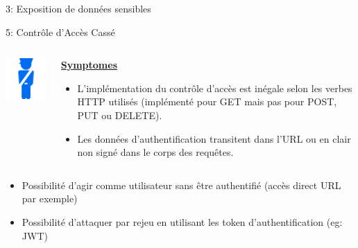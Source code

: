 \documentclass[final,hyperref={pdfpagelabels=false}]{beamer}
\begin{document}
\begin{frame}[t]
\begin{columns}[t]
\begin{column}{.465\textwidth}
\begin{block}{3: Exposition de données sensibles}
\end{block}


\begin{block}{5: Contrôle d'Accès Cassé}
	\begin{columns}[T]

		\begin{column}{.12\textwidth} %
			\includegraphics[scale=1.35]{access.png}
		\end{column}

		\begin{column}{.88\textwidth}
			\uline{\uline{\textbf{Symptomes}}}
			\begin{itemize}
				\item L'implémentation du contrôle d'accès est inégale selon les verbes HTTP utilisés (implémenté pour GET mais pas pour POST, PUT ou DELETE).
                \item Les données d'authentification transitent dans l'URL ou en clair non signé dans le corps des requêtes.
			\end{itemize}
		\end{column}
	\end{columns}

	\begin{itemize}
		\item Possibilité d'agir comme utilisateur sans être authentifié (accès direct URL par exemple)
		\item Possibilité d'attaquer par rejeu en utilisant les token d'authentification (eg: JWT)
	\end{itemize}


\end{block}
\end{column}
\end{columns}
\end{frame}
\end{document}
